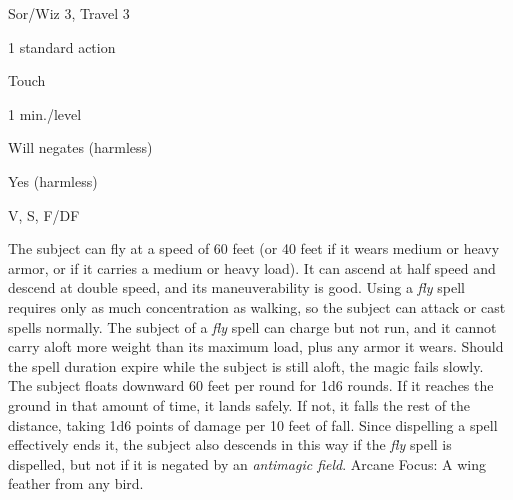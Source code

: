 
\begin{description*}
\item[Level:] Sor/Wiz 3, Travel 3
\item[Casting Time:] 1 standard action
\item[Range:] Touch
\item[Duration:] 1 min./level
\item[Saving Throw:] Will negates (harmless)
\item[Spell Resistance:] Yes (harmless)
\item[Components:] V, S, F/DF
\end{description*}

The subject can fly at a speed of 60 feet (or 40 feet if it wears medium or heavy
armor, or if it carries a medium or heavy load). It can ascend at half speed and
descend at double speed, and its maneuverability is good. Using a \textit{fly} spell
requires only as much concentration as walking, so the subject can attack or cast
spells normally. The subject of a \textit{fly} spell can charge but not run, and
it cannot carry aloft more weight than its maximum load, plus any armor it wears.
Should the spell duration expire while the subject is still aloft, the magic fails
slowly. The subject floats downward 60 feet per round for 1d6 rounds. If it reaches
the ground in that amount of time, it lands safely. If not, it falls the rest of
the distance, taking 1d6 points of damage per 10 feet of fall. Since dispelling
a spell effectively ends it, the subject also descends in this way if the \textit{fly
}spell is dispelled, but not if it is negated by an \textit{antimagic field}.
Arcane Focus: A wing feather from any bird.